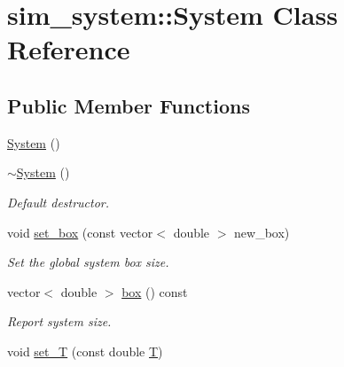 \hypertarget{classsim__system_1_1System}{\section{sim\-\_\-system\-:\-:System Class Reference}
\label{classsim__system_1_1System}
}
\subsection*{Public Member Functions}
\begin{DoxyCompactItemize}
\item 
\hyperlink{classsim__system_1_1System_a30af59fa4ac4f6f5df03b16d9f171cf9}{System} ()
\item 
\hypertarget{classsim__system_1_1System_abc709eafe0b2e1c51f10d9a018c9fc49}{\hyperlink{classsim__system_1_1System_abc709eafe0b2e1c51f10d9a018c9fc49}{$\sim$\-System} ()}\label{classsim__system_1_1System_abc709eafe0b2e1c51f10d9a018c9fc49}

\begin{DoxyCompactList}\small\item\em Default destructor. \end{DoxyCompactList}\item 
\hypertarget{classsim__system_1_1System_ac3c184539bb2e16a9fb1a9c85cb524b1}{void \hyperlink{classsim__system_1_1System_ac3c184539bb2e16a9fb1a9c85cb524b1}{set\-\_\-box} (const vector$<$ double $>$ new\-\_\-box)}\label{classsim__system_1_1System_ac3c184539bb2e16a9fb1a9c85cb524b1}

\begin{DoxyCompactList}\small\item\em Set the global system box size. \end{DoxyCompactList}\item 
\hypertarget{classsim__system_1_1System_aea62d18a4430aef3f5af0f66328358a2}{vector$<$ double $>$ \hyperlink{classsim__system_1_1System_aea62d18a4430aef3f5af0f66328358a2}{box} () const }\label{classsim__system_1_1System_aea62d18a4430aef3f5af0f66328358a2}

\begin{DoxyCompactList}\small\item\em Report system size. \end{DoxyCompactList}\item 
\hypertarget{classsim__system_1_1System_a8ecd87ed4857512844f60933bfa4ac16}{void \hyperlink{classsim__system_1_1System_a8ecd87ed4857512844f60933bfa4ac16}{set\-\_\-\-T} (const double \hyperlink{classsim__system_1_1System_a391570cba138604ffb8e242ea8207255}{T})}\label{classsim__system_1_1System_a8ecd87ed4857512844f60933bfa4ac16}


\end{DoxyCompactItemize}
